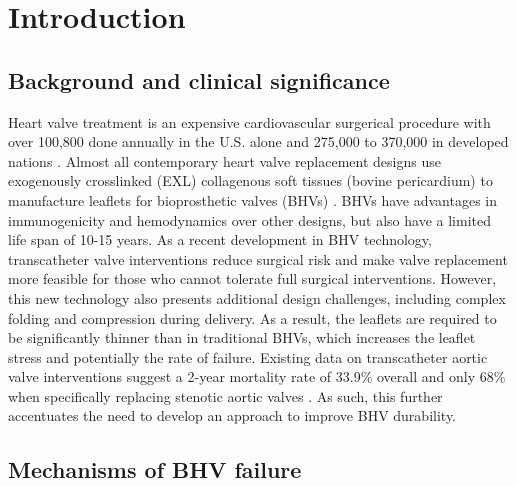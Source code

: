 \section{Introduction}
\subsection{Background and clinical significance}

	Heart valve treatment is an expensive cardiovascular surgerical procedure with over 100,800 done annually in the U.S. alone \cite{mozaffarian_heart_2016} and 275,000 to 370,000 in developed nations \cite{manji_future_2012}. 
	Almost all contemporary heart valve replacement designs use exogenously crosslinked (EXL) collagenous soft tissues (bovine pericardium) to manufacture leaflets for bioprosthetic valves (BHVs) \cite{starr_artificial_2007, soares_biomechanical_2016}. 
	BHVs have advantages in immunogenicity and hemodynamics over other designs, but also have a limited life span of 10-15 years. 
	As a recent development in BHV technology, transcatheter valve interventions \cite{bonow_accaha_2006, guidoin_marvel_2010} reduce surgical risk and make valve replacement more feasible for those who cannot tolerate full surgical interventions. 
	However, this new technology also presents additional design challenges, including complex folding and compression during delivery. 
	As a result, the leaflets are required to be significantly thinner than in traditional BHVs, which increases the leaflet stress and potentially the rate of failure. 
	Existing data on transcatheter aortic valve interventions suggest a 2-year mortality rate of 33.9\% overall \cite{mozaffarian_heart_2016} and only 68\% when specifically replacing stenotic aortic valves \cite{makkar_transcatheter_2012}. 
As such, this further accentuates the need to develop an approach to improve BHV durability. 
	
	 
\subsection{Mechanisms of BHV failure}

